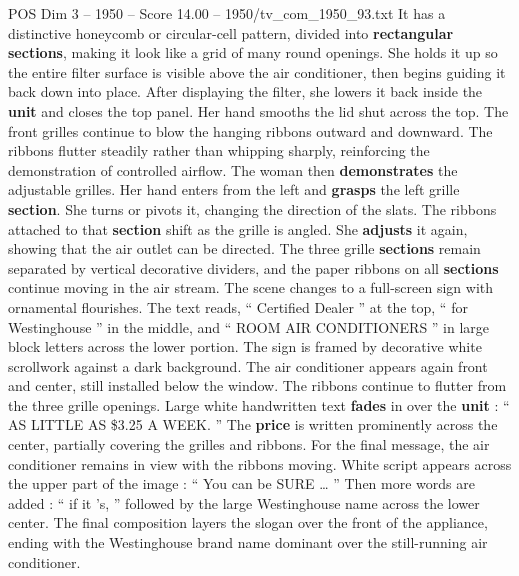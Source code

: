 \begin{textsample}{POS Dim 3 – 1950 – Score 14.00 – 1950/tv\_com\_1950\_93.txt}
It has a distinctive honeycomb or circular-cell pattern, divided into \textbf{rectangular} \textbf{sections}, making it look like a grid of many round openings.
She holds it up so the entire filter surface is visible above the air conditioner, then begins guiding it back down into place.
After displaying the filter, she lowers it back inside the \textbf{unit} and closes the top panel.
Her hand smooths the lid shut across the top.
The front grilles continue to blow the hanging ribbons outward and downward.
The ribbons flutter steadily rather than whipping sharply, reinforcing the demonstration of controlled airflow.
The woman then \textbf{demonstrates} the adjustable grilles.
Her hand enters from the left and \textbf{grasps} the left grille \textbf{section}.
She turns or pivots it, changing the direction of the slats.
The ribbons attached to that \textbf{section} shift as the grille is angled.
She \textbf{adjusts} it again, showing that the air outlet can be directed.
The three grille \textbf{sections} remain separated by vertical decorative dividers, and the paper ribbons on all \textbf{sections} continue moving in the air stream.
The scene changes to a full-screen sign with ornamental flourishes.
The text reads, “ Certified Dealer ” at the top, “ for Westinghouse ” in the middle, and “ ROOM AIR CONDITIONERS ” in large block letters across the lower portion.
The sign is framed by decorative white scrollwork against a dark background.
The air conditioner appears again front and center, still installed below the window.
The ribbons continue to flutter from the three grille openings.
Large white handwritten text \textbf{fades} in over the \textbf{unit} : “ AS LITTLE AS \$3.25 A WEEK. ” The \textbf{price} is written prominently across the center, partially covering the grilles and ribbons.
For the final message, the air conditioner remains in view with the ribbons moving.
White script appears across the upper part of the image : “ You can be SURE … ” Then more words are added : “ if it ’s, ” followed by the large Westinghouse name across the lower center.
The final composition layers the slogan over the front of the appliance, ending with the Westinghouse brand name dominant over the still-running air conditioner.

\end{textsample}
